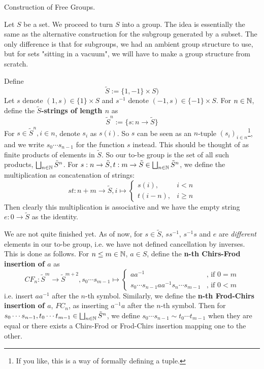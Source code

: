 \documentclass[../book.tex]{subfiles}
\begin{document}
\begin{ex} \dolater Construction of Free Groups. 

    Let $S$ be a set. We proceed to turn $S$ into a group.
    The idea is essentially the same as the alternative 
    construction for the subgroup generated by a subset.
    The only difference is that for subgroups, 
    we had an ambient group structure to use,
    but for sets "sitting in a vacuum", 
    we will have to make a group structure from scratch.
    
    Define 
    \[\tilde{S} := \{1,-1\}\times S)\]
    Let $s$ denote $(1,s) \in \{1\} \times S$ and
    $s^{-1}$ denote $(-1,s) \in \{-1\} \times S$. 
    For $n \in \mathbb{N}$, define the \textbf{$\tilde{S}$-strings of length $n$} as
    \[
        \tilde{S}^n := \{ s : n \to \tilde{S} \}
    \]
    For $s \in \tilde{S}^n, i \in n$, denote $s_i$ as $s(i)$.
    So $s$ can be seen as an $n$-tuple $(s_i)_{i \in n}$\footnote{If you like,
    this is a way of formally
    defining a tuple.},
    and we write $s_0\cdots s_{n-1}$ for the function $s$ instead.
    This should be thought of as finite products of elements in $\tilde{S}$.
    So our to-be group is the set of all such products, 
    $\bigsqcup_{n \in \mathbb{N}} \tilde{S}^n$.
    For 
    $s : n \to \tilde{S}, t : m \to \tilde{S} \in \bigsqcup_{n \in \mathbb{N}} \tilde{S}^n$,
    we define the multiplication as concatenation of strings: 
    \[
        st : n+m \to \tilde{S}, i \mapsto 
        \begin{cases}
            s(i), & i < n \\
            t(i-n), & i \geq n
        \end{cases}
    \]
    Then clearly this multiplication is associative and 
    we have the empty string $e : 0 \to \tilde{S}$ as the identity. 
    
    We are not quite finished yet.
    As of now, for $s \in \tilde{S}$, 
    $ss^{-1}$, $s^{-1}s$ and $e$ are \emph{different} elements in our to-be group,
    i.e. we have not defined cancellation by inverses. 
    This is done as follows. 
    For $n \leq m \in \mathbb{N}$, $a \in S$,  
    define the \textbf{n-th Chirs-Frod insertion of $a$}
    as 
    \[
        CF_n : \tilde{S}^m \to \tilde{S}^{m+2}, 
        s_0\cdots s_{m-1} \mapsto 
        \begin{cases}
        aa^{-1} & \text{, if } 0 = m\\
        s_0 \cdots s_{n-1} a a^{-1} s_n \cdots s_{m-1} & \text{, if } 0 < m
        \end{cases}
    \]
    i.e. insert $aa^{-1}$ after the $n$-th symbol. 
    Similarly, we define the \textbf{n-th Frod-Chirs insertion of $a$}, $FC_n$, 
    as inserting $a^{-1}a$ after the $n$-th symbol. 
    Then for 
    $s_0\cdots s_{n-1}, t_0\cdots t_{m-1} \in \bigsqcup_{n \in \mathbb{N}} \tilde{S}^n$, 
    we define $s_0\cdots s_{n-1} \sim t_0\cdots t_{m-1}$ when
    they are equal or there exists a Chirs-Frod or Frod-Chirs insertion
    mapping one to the other. 
    

\end{ex}
\end{document}
